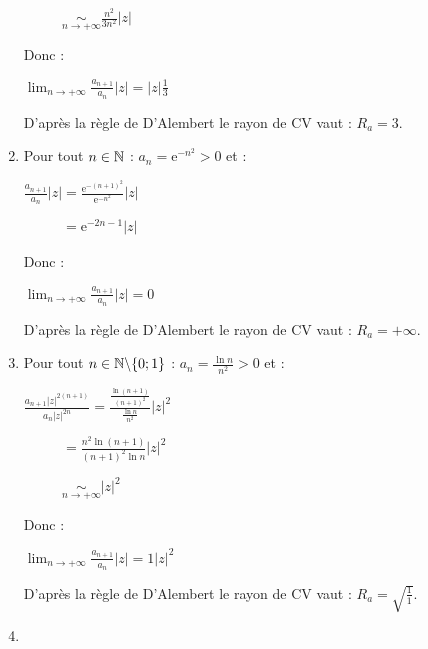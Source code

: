 \documentclass{book}
\begin{document}
\begin{Exercice}
\begin{Correction}
\begin{enumerate}
		\hspace{0.7cm} $\phantom{ \frac{ a_{n+1} }{ a_n } |z| } \underset{ n \to + \infty }{\sim} \frac{ n^2 }{ 3  n^2}|z| $
				
	Donc :
	
		\hspace{0.7cm} $\lim_{n \to + \infty} \frac{ a_{n+1} }{ a_n } |z| = |z| \frac{1}{3}$ 
		
	D'après la règle de D'Alembert le rayon de CV vaut : $R_a = 3$.
			
     
\item %
	Pour tout $n \in \mathbb{N}$ : $a_n = \mathrm{e}^{ - n^2 } > 0$ et :    
    
		\hspace{0.7cm} $\frac{ a_{n+1} }{ a_n } |z| = \frac{ \mathrm{e}^{ - (n+1)^2 }  }{  \mathrm{e}^{ - n^2 } } |z|$

		\hspace{0.7cm} $\phantom{ \frac{ a_{n+1} }{ a_n } |z| } = \mathrm{e}^{ - 2n - 1 }|z|$
		
	Donc :
	
		\hspace{0.7cm} $\lim_{n \to + \infty} \frac{ a_{n+1} }{ a_n } |z| = 0$ 
		
	D'après la règle de D'Alembert le rayon de CV vaut : $R_a = + \infty$.
	
	     
\item %
	Pour tout $n \in \mathbb{N} \backslash \{ 0 ; 1 \}$ : $a_n = \frac{ \ln n }{ n^2 } > 0$ et :    
    
 	\hspace{0.7cm} $\frac{ a_{n+1}|z|^{2(n+1)}}{ a_n|z|^{2n} }  = \frac{ \frac{ \ln (n+1) }{ (n+1)^2 } }{ \frac{ \ln n }{ n^2 }  } |z|^2$

		\hspace{0.7cm} $\phantom{ \frac{ a_{n+1} }{ a_n } |z| } = \frac{ n^2  \ln(n+1) }{ (n+1)^2 \ln n } |z|^2$

		\hspace{0.7cm} $\phantom{ \frac{ a_{n+1} }{ a_n } |z| } \underset{ n \to + \infty }{\sim} |z|^2 $
		
	Donc :
	
		\hspace{0.7cm} $\lim_{n \to + \infty} \frac{ a_{n+1} }{ a_n } |z| = 1 |z|^2$ 
		
	D'après la règle de D'Alembert le rayon de CV vaut : $R_a = \sqrt{\frac{1}{1}}$.


\item %
%


\end{enumerate}
\end{Correction}
\end{Exercice}
\end{document}
